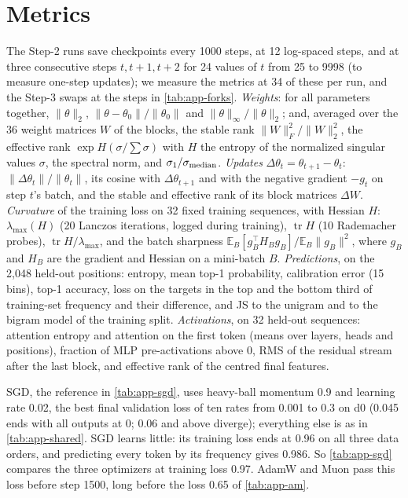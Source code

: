 \section{Metrics}
\label{app:metrics}

The Step-2 runs save checkpoints every 1000 steps, at 12 log-spaced steps, and at three consecutive steps $t,t+1,t+2$
for 24 values of $t$ from 25 to 9998 (to measure one-step updates); we measure the metrics at 34 of these per run, and
the Step-3 swaps at the steps in \cref{tab:app-forks}. \emph{Weights}: for all parameters together, $\|\theta\|_2$,
$\|\theta-\theta_0\|/\|\theta_0\|$ and $\|\theta\|_\infty/\|\theta\|_2$; and, averaged over the 36 weight matrices
$W$ of the blocks, the stable rank $\|W\|_F^2/\|W\|_2^2$, the effective rank $\exp H(\sigma/\textstyle\sum\sigma)$
with $H$ the entropy of the normalized singular values $\sigma$, the spectral norm, and $\sigma_1/\sigma_{\rm median}$.
\emph{Updates} $\Delta\theta_t=\theta_{t+1}-\theta_t$: $\|\Delta\theta_t\|/\|\theta_t\|$, its cosine with
$\Delta\theta_{t+1}$ and with the negative gradient $-g_t$ on step $t$'s batch, and the stable and effective rank of
its block matrices $\Delta W$. \emph{Curvature} of the training loss on 32 fixed training sequences, with Hessian $H$:
$\lambda_{\max}(H)$ (20 Lanczos iterations, logged during training), $\operatorname{tr}H$ (10 Rademacher probes),
$\operatorname{tr}H/\lambda_{\max}$, and the batch sharpness $\mathbb{E}_B[g_B^\top H_Bg_B]/\mathbb{E}_B\|g_B\|^2$,
where $g_B$ and $H_B$ are the gradient and Hessian on a mini-batch $B$.
\emph{Predictions}, on the 2{,}048 held-out
positions: entropy, mean top-1 probability, calibration error (15 bins), top-1 accuracy, loss on the targets in the top
and the bottom third of training-set frequency and their difference, and JS to the unigram and to the bigram model
of the training split. \emph{Activations}, on 32 held-out sequences: attention entropy
and attention on the first token (means over layers, heads and positions), fraction of MLP pre-activations above 0,
RMS of the residual stream after the last block, and effective rank of the centred final features.

SGD, the reference in \cref{tab:app-sgd}, uses heavy-ball momentum 0.9 and learning rate 0.02, the best final
validation loss of ten rates from 0.001 to 0.3 on d0 (0.045 ends with all outputs at 0; 0.06 and above diverge);
everything else is as in \cref{tab:app-shared}. SGD learns little: its training loss ends at 0.96 on all three data
orders, and predicting every token by its frequency gives 0.986. So \cref{tab:app-sgd} compares the three optimizers
at training loss 0.97. AdamW and Muon pass this loss before step 1500, long before the loss 0.65 of
\cref{tab:app-am}.

